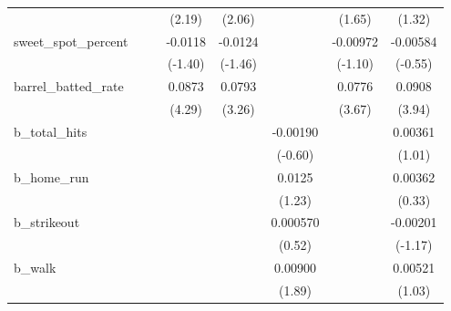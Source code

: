 {\begin{tabular}{l*{7}{c}}
            &                     &                     &      (2.19)         &      (2.06)         &                     &      (1.65)         &      (1.32)         \\
[1em]
sweet\_spot\_percent&                     &                     &     -0.0118         &     -0.0124         &                     &    -0.00972         &    -0.00584         \\
            &                     &                     &     (-1.40)         &     (-1.46)         &                     &     (-1.10)         &     (-0.55)         \\
[1em]
barrel\_batted\_rate&                     &                     &      0.0873\sym{***}&      0.0793\sym{**} &                     &      0.0776\sym{***}&      0.0908\sym{***}\\
            &                     &                     &      (4.29)         &      (3.26)         &                     &      (3.67)         &      (3.94)         \\
[1em]
b\_total\_hits&                     &                     &                     &                     &    -0.00190         &                     &     0.00361         \\
            &                     &                     &                     &                     &     (-0.60)         &                     &      (1.01)         \\
[1em]
b\_home\_run  &                     &                     &                     &                     &      0.0125         &                     &     0.00362         \\
            &                     &                     &                     &                     &      (1.23)         &                     &      (0.33)         \\
[1em]
b\_strikeout &                     &                     &                     &                     &    0.000570         &                     &    -0.00201         \\
            &                     &                     &                     &                     &      (0.52)         &                     &     (-1.17)         \\
[1em]
b\_walk      &                     &                     &                     &                     &     0.00900         &                     &     0.00521         \\
            &                     &                     &                     &                     &      (1.89)         &                     &      (1.03)         \\

\end{tabular}}
